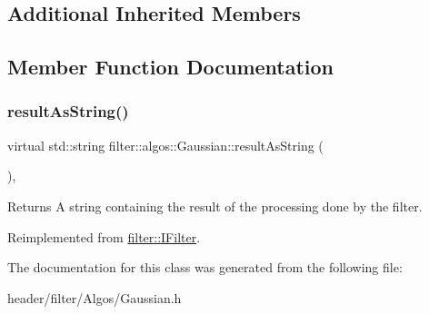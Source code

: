 \subsection*{Additional Inherited Members}


\subsection{Member Function Documentation}
\mbox{\label{classfilter_1_1algos_1_1_gaussian_a5f2ba86fa61807781b46fe321e435c29}} 
\subsubsection{\texorpdfstring{result\+As\+String()}{resultAsString()}}
{\footnotesize\ttfamily virtual std\+::string filter\+::algos\+::\+Gaussian\+::result\+As\+String (\begin{DoxyParamCaption}{ }\end{DoxyParamCaption})\hspace{0.3cm}{\ttfamily [inline]}, {\ttfamily [virtual]}}

\begin{DoxyReturn}{Returns}
A string containing the result of the processing done by the filter. 
\end{DoxyReturn}


Reimplemented from \hyperlink{classfilter_1_1_i_filter_ab99902b060a6d9edc3452a8c9f85e37e}{filter\+::\+I\+Filter}.



The documentation for this class was generated from the following file\+:\begin{DoxyCompactItemize}
\item 
header/filter/\+Algos/Gaussian.\+h\end{DoxyCompactItemize}
